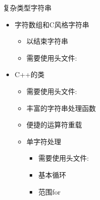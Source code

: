 \begin{frame}[fragile]{复杂类型}{字符串}
  \stretchon
  \begin{itemize}
  \item 字符数组和C风格字符串
    \begin{itemize}
    \item 以结束字符串
    \item 需要使用头文件:
    \end{itemize}
  \item C++的类
    \begin{itemize}
    \item 需要使用头文件:
    \item 丰富的字符串处理函数
    \item 便捷的运算符重载
    \item 单字符处理
      \begin{itemize}
      \item 需要使用头文件:
      \item 基本循环
      \item 范围for
      \end{itemize}
    \end{itemize}
  \end{itemize}
  \stretchoff
\end{frame}

